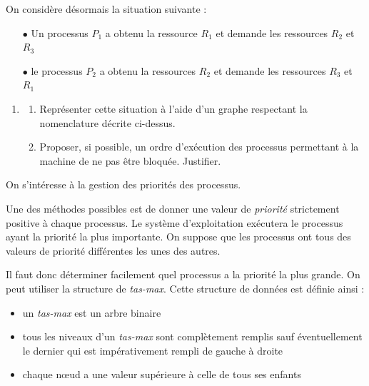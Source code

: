 \documentclass[a4paper, 11pt]{article}
\begin{document}
On considère désormais la situation suivante :
\begin{itemize}
	\item[$\bullet$] Un processus $P_1$ a obtenu la ressource $R_1$ et demande les ressources $R_2$ et $R_3$
	\item[$\bullet$] le processus $P_2$ a obtenu la ressources $R_2$ et demande les ressources $R_3$ et $R_1$
\end{itemize}


\begin{enumerate}[resume*]
	\item \begin{enumerate}[label=\underline{\alph*.}]
			\item Représenter cette situation à l'aide d'un graphe respectant la nomenclature décrite ci-dessus.
			\item Proposer, si possible, un ordre d'exécution des processus permettant à la machine de ne pas être bloquée. Justifier.
			\end{enumerate}
\end{enumerate}


On s'intéresse à la gestion des priorités des processus.

Une des méthodes possibles est de donner une valeur de \textit{priorité} strictement positive à chaque processus.
Le système d'exploitation exécutera le processus ayant la priorité la plus importante.
On suppose que les processus ont tous des valeurs de priorité différentes les unes des autres.

Il faut donc déterminer facilement quel processus a la priorité la plus grande.
On peut utiliser la structure de \textit{tas-max}.
Cette structure de données est définie ainsi :
\begin{itemize}
	\item un \textit{tas-max} est un arbre binaire
	\item tous les niveaux d'un \textit{tas-max} sont complètement remplis sauf éventuellement le dernier qui est impérativement rempli de gauche à droite
	\item chaque n\oe{}ud a une valeur supérieure à celle de tous ses enfants
\end{itemize}
\end{document}
